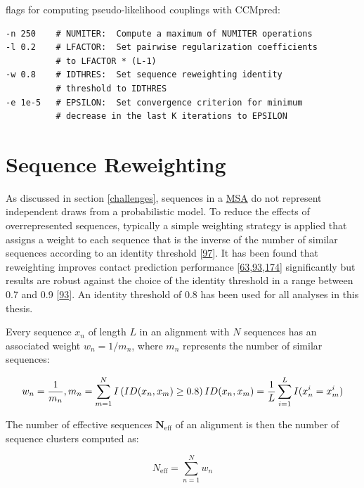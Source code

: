 \documentclass[11pt,a4paper,twoside]{book}
\newcommand{\neff}{N_\mathrm{eff}}
\theoremstyle{definition}
\theoremstyle{definition}
\theoremstyle{remark}
\begin{document}
flags for computing pseudo-likelihood couplings with CCMpred:

\begin{verbatim}
-n 250    # NUMITER:  Compute a maximum of NUMITER operations
-l 0.2    # LFACTOR:  Set pairwise regularization coefficients 
          # to LFACTOR * (L-1) 
-w 0.8    # IDTHRES:  Set sequence reweighting identity 
          # threshold to IDTHRES
-e 1e-5   # EPSILON:  Set convergence criterion for minimum 
          # decrease in the last K iterations to EPSILON
\end{verbatim}

\section{Sequence Reweighting}\label{seq-reweighting}

As discussed in section \ref{challenges}, sequences in a
\protect\hyperlink{abbrev}{MSA} do not represent independent draws from
a probabilistic model. To reduce the effects of overrepresented
sequences, typically a simple weighting strategy is applied that assigns
a weight to each sequence that is the inverse of the number of similar
sequences according to an identity threshold
{[}\protect\hyperlink{ref-Stein2015a}{97}{]}. It has been found that
reweighting improves contact prediction performance
{[}\protect\hyperlink{ref-Jones2012}{63},\protect\hyperlink{ref-Morcos2011}{93},\protect\hyperlink{ref-Buslje2009}{174}{]}
significantly but results are robust against the choice of the identity
threshold in a range between 0.7 and 0.9
{[}\protect\hyperlink{ref-Morcos2011}{93}{]}. An identity threshold of
0.8 has been used for all analyses in this thesis.

Every sequence \(x_n\) of length \(L\) in an alignment with \(N\)
sequences has an associated weight \(w_n = 1/m_n\), where \(m_n\)
represents the number of similar sequences:

\begin{equation} 
  w_n = \frac{1}{m_n}, m_n = \sum_{m=1}^N I \left( ID(x_n, x_m) \geq 0.8 \right) \\
  ID(x_n, x_m)=\frac{1}{L} \sum_{i=1}^L I(x_n^i = x_m^i)
  \label{eq:seqweight}
\end{equation}

The number of effective sequences \(\mathbf{\neff}\) of an alignment is
then the number of sequence clusters computed as:

\begin{equation} 
  \neff = \sum_{n=1}^N w_n
  \label{eq:neff}
\end{equation}
\end{document}
